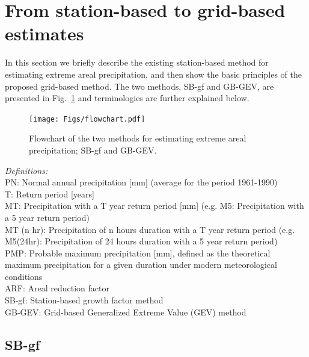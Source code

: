 \documentclass[12pt,a4paper,english]{article}
\begin{document}
\clearpage


\section{From station-based to grid-based estimates}

In this section we briefly describe the existing station-based method for estimating extreme areal precipitation, and then show the basic principles of the proposed grid-based method. The two methods, SB-gf and GB-GEV, are presented in Fig.~\ref{data:fig1} and terminologies are further explained below.

\begin{figure}[htbp]
\begin{center}
\texttt{[image: Figs/flowchart.pdf]} 
\vspace{-10mm}
\caption[flowchart]{\label{data:fig1}Flowchart of the two methods for estimating extreme areal precipitation; SB-gf and GB-GEV.}
\end{center}
\end{figure}

\noindent \textsl{Definitions:}\\
PN:  Normal annual precipitation [mm] (average for the period 1961-1990)\\
T: Return period [years]\\
MT: Precipitation with a T year return period [mm] (e.g. M5: Precipitation with a 5 year return period)\\
MT (n hr): Precipitation of n hours duration with a T year return period (e.g. M5(24hr): Precipitation of 24 hours duration with a 5 year return period)\\
PMP: Probable maximum precipitation [mm], defined as the theoretical maximum precipitation for a given duration under modern meteorological conditions \citep{WMO2009a} \\
ARF: Areal reduction factor \citep{NERC1975,Bell1976} \\
SB-gf: Station-based growth factor method \citep{NERC1975,ForlandandKristoffersen1989,Forland1992} \\
GB-GEV: Grid-based Generalized Extreme Value (GEV) method 

\subsection{SB-gf}
\end{document}
